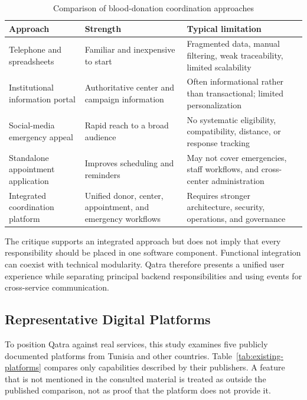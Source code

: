 \begin{table}[H]
\centering\small
\begin{tabularx}{\textwidth}{|P{3.0cm}|Y|Y|}
\hline
{}\textbf{Approach} & \textbf{Strength} & \textbf{Typical limitation}\\ \hline
Telephone and spreadsheets & Familiar and inexpensive to start & Fragmented data, manual filtering, weak traceability, limited scalability\\ \hline
Institutional information portal & Authoritative center and campaign information & Often informational rather than transactional; limited personalization\\ \hline
Social-media emergency appeal & Rapid reach to a broad audience & No systematic eligibility, compatibility, distance, or response tracking\\ \hline
Standalone appointment application & Improves scheduling and reminders & May not cover emergencies, staff workflows, and cross-center administration\\ \hline
Integrated coordination platform & Unified donor, center, appointment, and emergency workflows & Requires stronger architecture, security, operations, and governance\\ \hline
\end{tabularx}
\caption{Comparison of blood-donation coordination approaches}
\label{tab:existing-approaches}
\end{table}

The critique supports an integrated approach but does not imply that every responsibility should be placed in one software component. Functional integration can coexist with technical modularity. Qatra therefore presents a unified user experience while separating principal backend responsibilities and using events for cross-service communication.

\subsection{Representative Digital Platforms}
To position Qatra against real services, this study examines five publicly documented platforms from Tunisia and other countries. Table~\ref{tab:existing-platforms} compares only capabilities described by their publishers. A feature that is not mentioned in the consulted material is treated as outside the published comparison, not as proof that the platform does not provide it.

